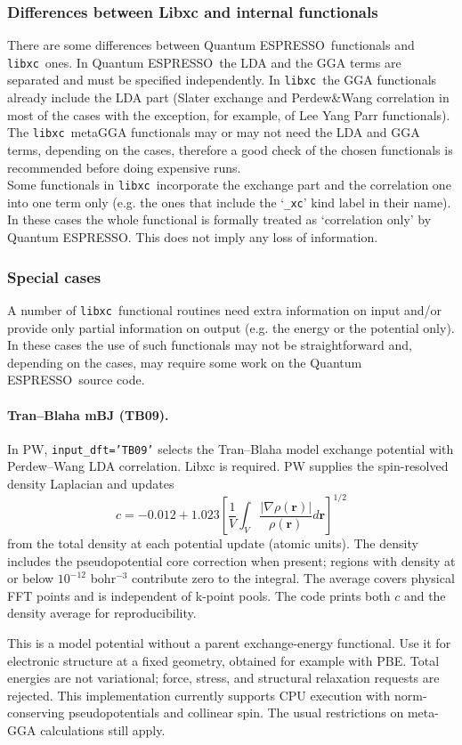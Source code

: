 \documentclass[12pt,a4paper]{article}
\def\qe{{\sc Quantum ESPRESSO}}
\def\libxc{\texttt{libxc}}
\begin{document}
\subsubsection{Differences between Libxc and internal functionals}
There are some differences between \qe\ functionals and \libxc\ ones. In \qe\ the LDA and the GGA terms are separated and must be specified independently. In \libxc\ the GGA functionals already include the LDA part (Slater exchange and Perdew\&Wang correlation in most of the cases with the exception, for example, of Lee Yang Parr functionals).\\
The \libxc\ metaGGA functionals may or may not need the LDA and GGA terms, depending on the cases, therefore a good check of the chosen functionals is recommended before doing expensive runs.\\
Some functionals in \libxc\ incorporate the exchange part and the correlation one into one term only (e.g. the ones that include the `\texttt{\_xc}' kind label in their name). In these cases the whole functional is formally treated as `correlation only' by \qe. This does not imply any loss of information.
%
\subsubsection{Special cases}
A number of \libxc\ functional routines need extra information on input and/or provide only partial information on output (e.g. the energy or the potential only). In these cases the use of such functionals may not be straightforward and, depending on the cases, may require some work on the \qe\ source code.
%
\paragraph{Tran--Blaha mBJ (TB09).}
In PW, \texttt{input\_dft='TB09'} selects the Tran--Blaha model exchange
potential with Perdew--Wang LDA correlation. Libxc is required. PW supplies
the spin-resolved density Laplacian and updates
\[
 c=-0.012+1.023\left[\frac{1}{V}\int_V
             \frac{|\nabla\rho(\mathbf r)|}{\rho(\mathbf r)}d\mathbf r\right]^{1/2}
\]
from the total density at each potential update (atomic units). The density
includes the pseudopotential core correction when present; regions with
density at or below $10^{-12}$ bohr$^{-3}$ contribute zero to the integral.
The average covers physical FFT points and is independent of k-point pools.
The code prints both $c$ and the density average for reproducibility.

This is a model potential without a parent exchange-energy functional.
Use it for electronic structure at a fixed geometry, obtained for example
with PBE. Total energies are not variational; force, stress, and structural
relaxation requests are rejected. This implementation currently supports
CPU execution with norm-conserving pseudopotentials and collinear spin.
The usual restrictions on meta-GGA calculations still apply.
\end{document}

